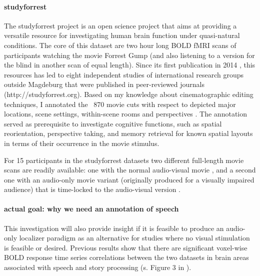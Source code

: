 \paragraph{studyforrest}
%
The studyforrest project is an open science project that aims at providing a
versatile resource for investigating human brain function under quasi-natural
conditions.
%
The core of this dataset are two hour long BOLD fMRI scans of participants
watching the movie Forrest Gump (and also listening to a version for the blind
in another scan of equal length).
%
Since its first publication in 2014 \citep{hanke2014audiomovie}, this resources
has led to eight independent studies of international research groups outside
Magdeburg that were published in peer-reviewed journals
(http://studyforrest.org).
%
Based on my knowledge about cinematographic editing techniques, I annotated the
~870 movie cuts with respect to depicted major locations, scene settings,
within-scene rooms and perspectives \citep{haeusler2016cutanno}.
%
The annotation served as prerequisite to investigate cognitive functions, such
as spatial reorientation, perspective taking, and memory retrieval for known
spatial layouts in terms of their occurrence in the movie stimulus.

For 15 participants in the studyforrest datasets two different full-length movie
scans are readily available: one with the normal audio-visual movie
\citep{hanke2016simultaneous}, and a second one with an audio-only movie variant
(originally produced for a visually impaired audience) that is time-locked to
the audio-visual version \citep{hanke2014audiomovie}.

\paragraph{actual goal: why we need an annotation of speech}
%
This investigation will also provide insight if it is feasible to produce an
audio-only localizer paradigm as an alternative for studies where no visual
stimulation is feasible or desired.
%
Previous results show that there are significant voxel-wise BOLD response time
series correlations between the two datasets in brain areas associated with
speech and story processing (s. Figure 3 in \citep{hanke2016simultaneous}).

